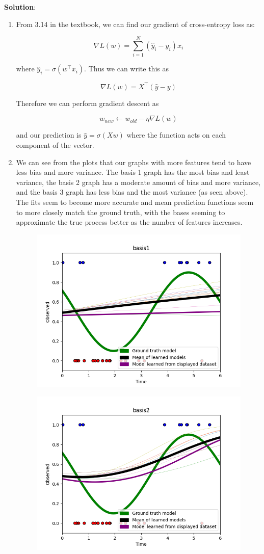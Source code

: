 \documentclass[submit]{../harvardml}
\newenvironment{solution}{
    \vspace{2mm}
    \color{blue}\noindent\textbf{Solution}:
}{}
\begin{document}
\begin{solution}

\begin{enumerate}
    \item From 3.14 in the textbook, we can find our gradient of cross-entropy loss as:

    \[
    \nabla L(w) = \sum_{i=1}^N(\hat y_i - y_i)x_i
    \]

    where $\hat y_i = \sigma(w^\top x_i)$. Thus we can write this as

    \[
    \nabla L(w) = X^\top (\hat y - y)
    \]

    Therefore we can perform gradient descent as

    \[
    w_{new} \leftarrow w_{old} - \eta \nabla L(w)
    \]

    and our prediction is $\hat y=\sigma(Xw)$ where the function acts on each component of the vector.

    \item We can see from the plots that our graphs with more features tend to have less bias and more variance. The basis 1 graph has the most bias and least variance, the basis 2 graph has a moderate amount of bias and more variance, and the basis 3 graph has less bias and the most variance (as seen above). The fits seem to become more accurate and mean prediction functions seem to more closely match the ground truth, with the bases seeming to approximate the true process better as the number of features increases.

    \begin{figure}[H]
        \centering
        \includegraphics[width=0.5\linewidth]{basis1.png}
    \end{figure}

    \begin{figure}[H]
        \centering
        \includegraphics[width=0.5\linewidth]{basis2.png}
    \end{figure}


\end{enumerate}
\end{solution}
\end{document}
